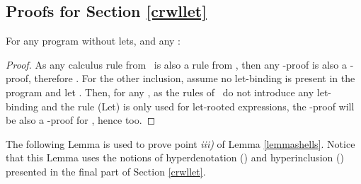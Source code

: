 \subsection{Proofs for Section \ref{crwllet}}

For any program  without lets, and any :

\begin{proof}
As any calculus rule from \crwl\ is also a rule from \crwll, then any \crwl-proof is also a \crwll-proof, therefore .
For the other inclusion, assume no let-binding is present in the program and let . Then, for any , as the rules of \crwll\ do not introduce any let-binding and the rule (Let) is only used for let-rooted expressions, the \crwll-proof  will be also a \crwl-proof for , hence  too.
\end{proof}



The following Lemma is used to prove point \emph{iii)} of Lemma \ref{lemmashells}. Notice that this Lemma uses the notions of hyperdenotation () and hyperinclusion () presented in the final part of Section \ref{crwllet}.

